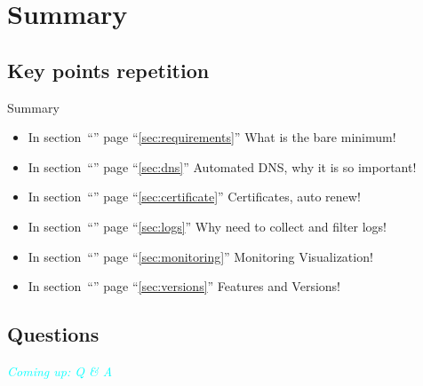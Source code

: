 \section{Summary}
\subsection{Key points repetition}

\begin{frame}
	\begin{exampleblock}{Summary}
		\begin{itemize}[<+->]
			\item In section~``'' page ``\ref{sec:requirements}'' What is the bare minimum!
			\item In section~``'' page ``\ref{sec:dns}'' Automated DNS, why it is so important!
			\item In section~``'' page ``\ref{sec:certificate}'' Certificates, auto renew!
			\item In section~``'' page ``\ref{sec:logs}'' Why need to collect and filter logs!
			\item In section~``'' page ``\ref{sec:monitoring}'' Monitoring Visualization!
			\item In section~``'' page ``\ref{sec:versions}'' Features and Versions!
		\end{itemize}
	\end{exampleblock}
\end{frame}

\subsection*{Questions}
\begin{frame}
	\begin{center}
		\Huge \textcolor{cyan}{\emph{Coming up: Q \& A}}
	\end{center}
\end{frame}